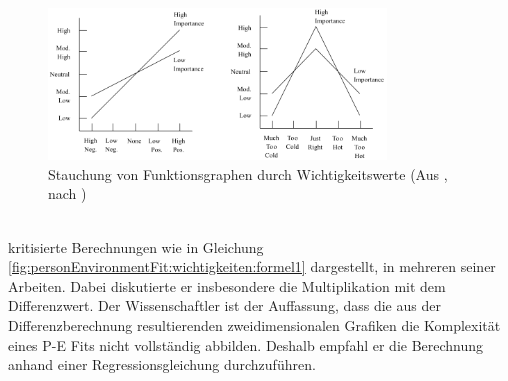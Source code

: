 \begin{figure}[h]
	\centering
	\includegraphics[width=0.8\textwidth]{gfx/Locke.png}
	\caption{Stauchung von Funktionsgraphen durch Wichtigkeitswerte (Aus \cite[S. 13f.]{edwards:2008}, nach \cite[S. 1305]{locke:1976})}
	\label{fig:personEnvironmentFit:wichtigkeiten:abb1}
\end{figure}\\
\textcite[S. 51ff.]{edwards:1991}\cite[S. 9ff.]{edwards:1990}\cite[S. 2ff.]{edwards:1993}\cite[S. 2ff.]{edwards:1993b} kritisierte Berechnungen wie in Gleichung \ref{fig:personEnvironmentFit:wichtigkeiten:formel1} dargestellt, in mehreren seiner Arbeiten. Dabei diskutierte er insbesondere die Multiplikation mit dem Differenzwert. Der Wissenschaftler ist der Auffassung, dass die aus der Differenzberechnung resultierenden zweidimensionalen Grafiken die Komplexität eines P-E Fits nicht vollständig abbilden. Deshalb empfahl er die Berechnung anhand einer Regressionsgleichung durchzuführen.


